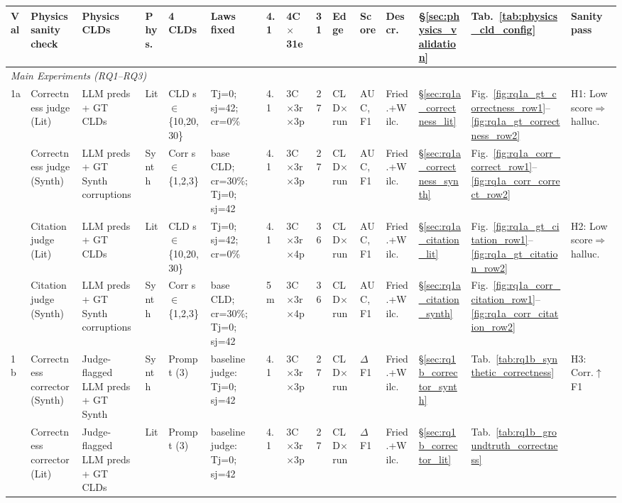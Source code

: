 \begin{landscape}
\begin{table}[H]
{\begin{tabular}{@{}l l l l l l l l c l l l l l l@{}}
Val & Physics sanity check & Physics CLDs & Phys. & 4 CLDs & Laws fixed & 4.1 & 4C$\times$31e & 31 & Edge & Score & Descr. & \S\ref{sec:physics_validation} & Tab.~\ref{tab:physics_cld_config} & Sanity pass \\
\midrule
\multicolumn{15}{l}{\textit{Main Experiments (RQ1--RQ3)}} \\
\midrule
\multirow{4}{*}{1a} 
  & Correctness judge (Lit) & LLM preds + GT CLDs & Lit & CLD s$\in$\{10,20,30\} & Tj=0; sj=42; cr=0\% & 4.1 & 3C$\times$3r$\times$3p & 27 & CLD$\times$run & AUC,F1 & Fried.+Wilc. & \S\ref{sec:rq1a_correctness_lit} & Fig.~\ref{fig:rq1a_gt_correctness_row1}--\ref{fig:rq1a_gt_correctness_row2} & \multirow{2}{*}{H1: Low score$\Rightarrow$halluc.} \\
  & Correctness judge (Synth) & LLM preds + GT Synth corruptions & Synth & Corr s$\in$\{1,2,3\} & base CLD; cr=30\%; Tj=0; sj=42 & 4.1 & 3C$\times$3r$\times$3p & 27 & CLD$\times$run & AUC,F1 & Fried.+Wilc. & \S\ref{sec:rq1a_correctness_synth} & Fig.~\ref{fig:rq1a_corr_correct_row1}--\ref{fig:rq1a_corr_correct_row2} & \\
  & Citation judge (Lit) & LLM preds + GT CLDs & Lit & CLD s$\in$\{10,20,30\} & Tj=0; sj=42; cr=0\% & 4.1 & 3C$\times$3r$\times$4p & 36 & CLD$\times$run & AUC,F1 & Fried.+Wilc. & \S\ref{sec:rq1a_citation_lit} & Fig.~\ref{fig:rq1a_gt_citation_row1}--\ref{fig:rq1a_gt_citation_row2} & \multirow{2}{*}{H2: Low score$\Rightarrow$halluc.} \\
  & Citation judge (Synth) & LLM preds + GT Synth corruptions & Synth & Corr s$\in$\{1,2,3\} & base CLD; cr=30\%; Tj=0; sj=42 & 5m & 3C$\times$3r$\times$4p & 36 & CLD$\times$run & AUC,F1 & Fried.+Wilc. & \S\ref{sec:rq1a_citation_synth} & Fig.~\ref{fig:rq1a_corr_citation_row1}--\ref{fig:rq1a_corr_citation_row2} & \\
\midrule
\multirow{2}{*}{1b}
  & Correctness corrector (Synth) & Judge-flagged LLM preds + GT Synth & Synth & Prompt (3) & baseline judge: Tj=0; sj=42 & 4.1 & 3C$\times$3r$\times$3p & 27 & CLD$\times$run & $\Delta$F1 & Fried.+Wilc. & \S\ref{sec:rq1b_corrector_synth} & Tab.~\ref{tab:rq1b_synthetic_correctness} & \multirow{2}{*}{H3: Corr.$\uparrow$F1} \\
  & Correctness corrector (Lit) & Judge-flagged LLM preds + GT CLDs & Lit & Prompt (3) & baseline judge: Tj=0; sj=42 & 4.1 & 3C$\times$3r$\times$3p & 27 & CLD$\times$run & $\Delta$F1 & Fried.+Wilc. & \S\ref{sec:rq1b_corrector_lit} & Tab.~\ref{tab:rq1b_groundtruth_correctness} & \\
\midrule

\end{tabular}}
\end{table}
\end{landscape}
